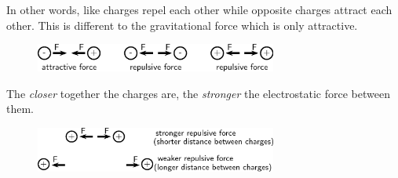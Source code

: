       \label{m38780*id200894}In other words, like charges repel each other while opposite
charges attract each other. This is different to the gravitational force which is only attractive.\par 
      \label{m38780*id200898}
    \setcounter{subfigure}{0}


	\begin{figure}[H] %
    \begin{center}
    \label{m38780*id200901!!!underscore!!!media}\label{m38780*id200901!!!underscore!!!printimage}\includegraphics[width=300px]{col11305.imgs/m38780_PG10C8_004.png} %
        
      \vspace{2pt}
    \vspace{.1in}
    
    \end{center}

 \end{figure}   

    \addtocounter{footnote}{-0}
    
      \par 
      \label{m38780*id200907}The \textsl{closer} together the charges are, the \textsl{stronger} the electrostatic force between them.\par 
      \label{m38780*id200921}
        
    \setcounter{subfigure}{0}


	\begin{figure}[H] %
    \begin{center}
    \label{m38780*id200924!!!underscore!!!media}\label{m38780*id200924!!!underscore!!!printimage}\includegraphics[width=300px]{col11305.imgs/m38780_PG10C8_005.png} %
        
      \vspace{2pt}
    \vspace{.1in}
    
    \end{center}

 \end{figure}   

